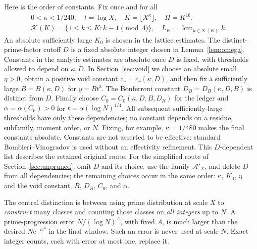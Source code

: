 \documentclass[10pt,reqno]{amsart}
\theoremstyle{remark}
\newcommand{\K}{\mathcal K}
\newcommand{\A}{\mathcal A}
\newcommand{\lcm}{\operatorname{lcm}}
\newcommand{\e}{\mathrm e}
\begin{document}
Here is the order of constants.  Fix once and for all
\begin{equation}\label{eq:parameters}
 \begin{gathered}
 0<\kappa<1/240,\quad t=\log X,\quad
 K=\lfloor X^\kappa\rfloor,\quad H=K^{10},\\
 \K(K)=\{1\leq k\leq K:k\equiv1\pmod4\},\quad
 L_K=\lcm_{k\in\K(K)}k.
 \end{gathered}
\end{equation}
An absolute sufficiently large $K_0$ is chosen in the lattice estimates.
The distinct-prime-factor cutoff $D$ is a fixed absolute integer chosen
in Lemma~\ref{lem:omega}.  Constants in the analytic estimates are
absolute once $D$ is fixed, with thresholds allowed to depend on
$\kappa,D$.  In Section~\ref{sec:void} we choose an absolute small
$\eta>0$, obtain a positive void constant $c_v=c_v(\kappa,D)$, and then
fix a sufficiently large $B=B(\kappa,D)$ for $y=Bt^3$.
The Bonferroni constant $D_B=D_B(\kappa,D,B)$ is distinct from $D$.
Finally choose $C_0=C_0(\kappa,D,B,D_B)$ for the ledger and
$\alpha=\alpha(C_0)>0$ for $t=\alpha(\log N)^{1/4}$.
All subsequent sufficiently-large thresholds have only these dependencies;
no constant depends on a residue, subfamily, moment order, or $N$.
Fixing, for example, $\kappa=1/480$ makes the final constants absolute.
Constants are not asserted to be effective: standard Bombieri--Vinogradov
is used without an effectivity refinement.
This $D$-dependent list describes the retained original route.  For the
simplified route of Section~\ref{sec:unpruned}, omit $D$ and its choice,
use the family $\A'_X$, and delete $D$ from all dependencies; the
remaining choices occur in the same order: $\kappa$, $K_0$, $\eta$ and
the void constant, $B$, $D_B$, $C_0$, and $\alpha$.

The central distinction is between using prime distribution at scale $X$
to \emph{construct} many classes and counting those classes on
\emph{all integers} up to $N$.  A prime-progression error
$N/(\log N)^A$, with fixed $A$, is much larger than the desired
$N\e^{-ct^3}$ in the final window.  Such an error is never used at scale
$N$.  Exact integer counts, each with error at most one, replace it.
\end{document}
